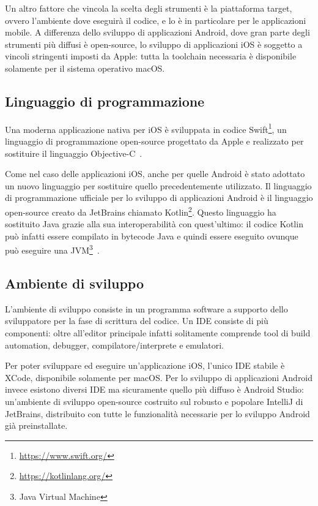 Un altro fattore che vincola la scelta degli strumenti è la piattaforma target,
ovvero l'ambiente dove eseguirà il codice,
e lo è in particolare per le applicazioni mobile. 
A differenza dello sviluppo di applicazioni Android,
dove gran parte degli strumenti più diffusi è open-source, 
lo sviluppo di applicazioni iOS è soggetto a vincoli stringenti imposti da Apple: 
tutta la toolchain necessaria è disponibile solamente per il sistema operativo macOS.

\subsection*{Linguaggio di programmazione}
Una moderna applicazione nativa per iOS è sviluppata in codice Swift\footnote{\href{https://www.swift.org/}{https://www.swift.org/}}, 
un linguaggio di programmazione open-source progettato da Apple e realizzato per sostituire il linguaggio Objective-C~\cite{kerr2018beginning}.

Come nel caso delle applicazioni iOS,
anche per quelle Android è stato adottato un nuovo linguaggio per sostituire quello precedentemente utilizzato. 
Il linguaggio di programmazione ufficiale per lo sviluppo di applicazioni Android è il linguaggio open-source creato da JetBrains chiamato Kotlin\footnote{\href{https://kotlinlang.org/}{https://kotlinlang.org/}}. 
Questo linguaggio ha sostituito Java grazie alla sua interoperabilità con quest'ultimo: 
il codice Kotlin può infatti essere compilato in bytecode Java e quindi essere eseguito ovunque può eseguire una JVM\footnote{Java Virtual Machine}~\cite{laurence2021programming}.

\subsection*{Ambiente di sviluppo}
L'ambiente di sviluppo consiste in un programma software a supporto dello sviluppatore per la fase di scrittura del codice. 
Un IDE consiste di più componenti: 
oltre all'editor principale infatti solitamente comprende tool di build automation, 
debugger, 
compilatore/interprete e emulatori.

Per poter sviluppare ed eseguire un'applicazione iOS,
l'unico IDE stabile è XCode, 
disponibile solamente per macOS. 
Per lo sviluppo di applicazioni Android invece esistono diversi IDE ma sicuramente quello più diffuso è Android Studio:
un'ambiente di sviluppo open-source costruito sul robusto e popolare IntelliJ di JetBrains,
distribuito con tutte le funzionalità necessarie per lo sviluppo Android già preinstallate.

